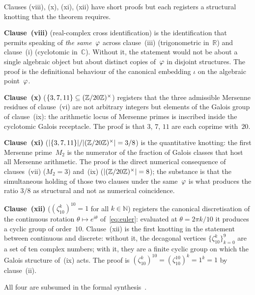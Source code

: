Clauses (viii), (x), (xi), (xii) have short proofs but each registers
a structural knotting that the theorem requires.

\textbf{Clause~(viii)} (real-complex cross identification) is the
identification that permits speaking of \emph{the same}~$\varphi$
across clause~(iii) (trigonometric in~$\mathbb{R}$) and clause~(i)
(cyclotomic in~$\mathbb{C}$).  Without it, the statement would not be
about a single algebraic object but about distinct copies
of~$\varphi$ in disjoint structures.  The proof is the definitional
behaviour of the canonical embedding $\iota$ on the algebraic
point~$\varphi$.

\textbf{Clause~(x)} ($\{3,7,11\}\subseteq(\mathbb{Z}/20\mathbb{Z})^{\times}$) registers that
the three admissible Mersenne residues of clause~(vi) are not
arbitrary integers but elements of the Galois group of clause~(ix):
the arithmetic locus of Mersenne primes is inscribed inside the
cyclotomic Galois receptacle.  The proof is that $3$, $7$, $11$ are
each coprime with~$20$.

\textbf{Clause~(xi)} ($|\{3,7,11\}|/|(\mathbb{Z}/20\mathbb{Z})^{\times}|=3/8$) is the
quantitative knotting: the first Mersenne prime~$M_{2}$ is the
numerator of the fraction of Galois classes that host all Mersenne
arithmetic.  The proof is the direct numerical consequence of
clauses~(vii) ($M_{2}=3$) and~(ix) ($|(\mathbb{Z}/20\mathbb{Z})^{\times}|=8$); the substance is
that the simultaneous holding of those two clauses under the
same~$\varphi$ is what produces the ratio $3/8$ as structural and not
as numerical coincidence.

\textbf{Clause~(xii)} ($(\zeta_{10}^{k})^{10}=1$ for all
$k\in\mathbb{N}$) registers the canonical discretisation of the
continuous rotation $\theta\mapsto e^{i\theta}$ of~\eqref{eq:euler}:
evaluated at $\theta=2\pi k/10$ it produces a cyclic group of
order~$10$.  Clause~(xii) is the first knotting in the statement
between continuous and discrete: without it, the decagonal vertices
$\{\zeta_{10}^{k}\}_{k=0}^{9}$ are a set of ten complex numbers; with
it, they are a finite cyclic group on which the Galois structure
of~(ix) acts.  The proof is
$(\zeta_{10}^{k})^{10}=(\zeta_{10}^{10})^{k}=1^{k}=1$ by clause~(ii).

All four are subsumed in the formal
synthesis~.

